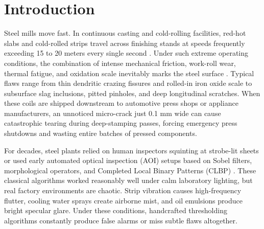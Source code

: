 \documentclass[10pt,a4paper]{article}
\begin{document}
\section{Introduction}
Steel mills move fast. In continuous casting and cold-rolling facilities, red-hot slabs and cold-rolled strips travel across finishing stands at speeds frequently exceeding 15 to 20 meters every single second \cite{survey2024}. Under such extreme operating conditions, the combination of intense mechanical friction, work-roll wear, thermal fatigue, and oxidation scale inevitably marks the steel surface \cite{neu2013}. Typical flaws range from thin dendritic crazing fissures and rolled-in iron oxide scale to subsurface slag inclusions, pitted pinholes, and deep longitudinal scratches. When these coils are shipped downstream to automotive press shops or appliance manufacturers, an unnoticed micro-crack just 0.1 mm wide can cause catastrophic tearing during deep-stamping passes, forcing emergency press shutdowns and wasting entire batches of pressed components.

For decades, steel plants relied on human inspectors squinting at strobe-lit sheets or used early automated optical inspection (AOI) setups based on Sobel filters, morphological operators, and Completed Local Binary Patterns (CLBP) \cite{survey2024, neu2013}. These classical algorithms worked reasonably well under calm laboratory lighting, but real factory environments are chaotic. Strip vibration causes high-frequency flutter, cooling water sprays create airborne mist, and oil emulsions produce bright specular glare. Under these conditions, handcrafted thresholding algorithms constantly produce false alarms or miss subtle flaws altogether.
\end{document}
